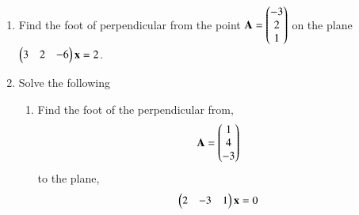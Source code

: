 \renewcommand{\theequation}{\theenumi}
\renewcommand{\thefigure}{\theenumi}
\begin{enumerate}[label=\thesubsection.\arabic*.,ref=\thesubsection.\theenumi]
%

\item Find the foot of perpendicular from the point $\mathbf{A}=\begin{pmatrix}-3\\2\\1\end{pmatrix}$ on the plane $\begin{pmatrix}3&2&-6\end{pmatrix}\mathbf{x} = 2$.
%
\solution

\item Solve the following
\begin{enumerate}
\item Find the foot of the perpendicular from,
\begin{align}
\mathbf{A} = \begin{pmatrix}1\\4\\-3\end{pmatrix}
\end{align} 
to the plane,
\begin{align}
\begin{pmatrix}2&-3&1\end{pmatrix}\mathbf{x} = 0
\label{eq:solutions/4/45/2/1/Q}
\end{align}
\solution


\end{enumerate}

\end{enumerate}


